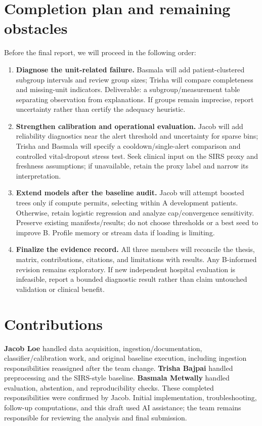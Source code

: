 \documentclass{article}
\begin{document}
\section{Completion plan and remaining obstacles}
Before the final report, we will proceed in the following order:
\begin{enumerate}
\item \textbf{Diagnose the unit-related failure.} Basmala will add patient-clustered subgroup intervals and review group sizes; Trisha will compare completeness and missing-unit indicators. Deliverable: a subgroup/measurement table separating observation from explanations. If groups remain imprecise, report uncertainty rather than certify the adequacy heuristic.
\item \textbf{Strengthen calibration and operational evaluation.} Jacob will add reliability diagnostics near the alert threshold and uncertainty for sparse bins; Trisha and Basmala will specify a cooldown/single-alert comparison and controlled vital-dropout stress test. Seek clinical input on the SIRS proxy and freshness assumptions; if unavailable, retain the proxy label and narrow its interpretation.
\item \textbf{Extend models after the baseline audit.} Jacob will attempt boosted trees only if compute permits, selecting within A development patients. Otherwise, retain logistic regression and analyze cap/convergence sensitivity. Preserve existing manifests/results; do not choose thresholds or a best seed to improve B. Profile memory or stream data if loading is limiting.
\item \textbf{Finalize the evidence record.} All three members will reconcile the thesis, matrix, contributions, citations, and limitations with results. Any B-informed revision remains exploratory. If new independent hospital evaluation is infeasible, report a bounded diagnostic result rather than claim untouched validation or clinical benefit.
\end{enumerate}

\section{Contributions}
\textbf{Jacob Loe} handled data acquisition, ingestion/documentation, classifier/calibration work, and original baseline execution, including ingestion responsibilities reassigned after the team change. \textbf{Trisha Bajpai} handled preprocessing and the SIRS-style baseline. \textbf{Basmala Metwally} handled evaluation, abstention, and reproducibility checks. These completed responsibilities were confirmed by Jacob. Initial implementation, troubleshooting, follow-up computations, and this draft used AI assistance; the team remains responsible for reviewing the analysis and final submission.
\end{document}
